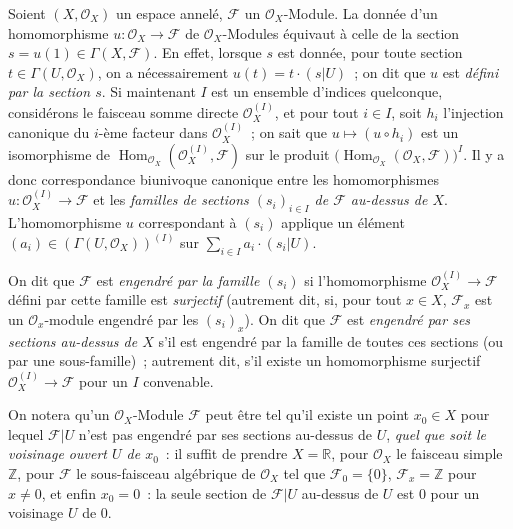 \begin{env}[5.1.1]
\label{0.5.1.1-fr}
Soient $(X,\mathcal{O}_X)$ un espace annelé, $\mathcal{F}$ un
$\mathcal{O}_X$-Module. La donnée d'un homomorphisme
$u:\mathcal{O}_X\to\mathcal{F}$ de $\mathcal{O}_X$-Modules équivaut à celle
de la section $s=u(1)\in\Gamma(X,\mathcal{F})$. En effet, lorsque $s$ est
donnée, pour toute section $t\in\Gamma(U,\mathcal{O}_X)$, on a nécessairement
$u(t)=t\cdot(s|U)$~; on dit que $u$ est \emph{défini par la section $s$}. Si
maintenant $I$ est un ensemble d'indices quelconque, considérons le faisceau
somme directe $\mathcal{O}_X^{(I)}$, et pour tout $i\in I$, soit $h_i$
l'injection canonique du $i$-ème facteur dans $\mathcal{O}_X^{(I)}$~; on sait
que $u\mapsto(u\circ h_i)$ est un isomorphisme de
$\operatorname{Hom}_{\mathcal{O}_X}(\mathcal{O}_X^{(I)},\mathcal{F})$ sur le
produit
$\bigl(\operatorname{Hom}_{\mathcal{O}_X}(\mathcal{O}_X,\mathcal{F})\bigr)^I$.
Il y a donc correspondance biunivoque canonique entre les homomorphismes
$u:\mathcal{O}_X^{(I)}\to\mathcal{F}$ et les \emph{familles de sections
$(s_i)_{i\in I}$ de $\mathcal{F}$ au-dessus de $X$}. L'homomorphisme $u$
correspondant à $(s_i)$ applique un élément
$(a_i)\in(\Gamma(U,\mathcal{O}_X))^{(I)}$ sur
$\sum_{i\in I}a_i\cdot(s_i|U)$.

On dit que $\mathcal{F}$ est \emph{engendré par la famille $(s_i)$} si
l'homomorphisme $\mathcal{O}_X^{(I)}\to\mathcal{F}$ défini
par cette famille est \emph{surjectif} (autrement dit, si, pour tout
$x\in X$, $\mathcal{F}_x$ est un $\mathcal{O}_x$-module engendré par les
$(s_i)_x$). On dit que $\mathcal{F}$ est \emph{engendré par ses sections
au-dessus de $X$} s'il est engendré par la famille de toutes ces sections (ou
par une sous-famille)~; autrement dit, s'il existe un homomorphisme surjectif
$\mathcal{O}_X^{(I)}\to\mathcal{F}$ pour un $I$ convenable.

On notera qu'un $\mathcal{O}_X$-Module $\mathcal{F}$ peut être tel qu'il
existe un point $x_0\in X$ pour lequel $\mathcal{F}|U$ n'est pas engendré par
ses sections au-dessus de $U$, \emph{quel que soit le voisinage ouvert $U$ de
$x_0$}~: il suffit de prendre $X=\mathbb{R}$, pour $\mathcal{O}_X$ le faisceau
simple $\mathbb{Z}$, pour $\mathcal{F}$ le sous-faisceau algébrique de
$\mathcal{O}_X$ tel que $\mathcal{F}_0=\{0\}$, $\mathcal{F}_x=\mathbb{Z}$ pour
$x\ne0$, et enfin $x_0=0$~: la seule section de $\mathcal{F}|U$ au-dessus de
$U$ est $0$ pour un voisinage $U$ de $0$.
\end{env}

